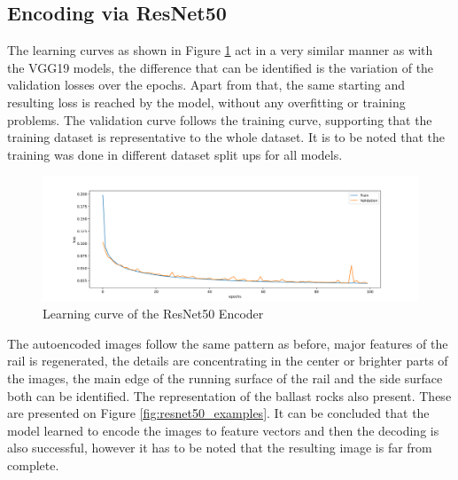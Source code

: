 \subsection{Encoding via ResNet50}
The learning curves as shown in Figure \ref{fig:resnet50_learning_curve} act in a very similar manner
as with the VGG19 models,
the difference that can be identified is the variation of the validation losses over the epochs.
Apart from that, the same starting and resulting loss is reached by the model,
without any overfitting or training problems.
The validation curve follows the training curve, supporting that the training dataset
is representative to the whole dataset.
It is to be noted that the training was done in different dataset split ups for all models.

\begin{figure}[!ht]
    \centering
    \includegraphics[width=\textwidth,trim={0 0 0 1cm},clip]{./results/resnet50_vgg19/20230514_213740_results.png}
    \caption{Learning curve of the ResNet50 Encoder}
    \label{fig:resnet50_learning_curve}
\end{figure}

The autoencoded images follow the same pattern as before, major features of the rail is regenerated,
the details are concentrating in the center or brighter parts of the images,
the main edge of the running surface of the rail and the side surface both can be identified.
The representation of the ballast rocks also present.
These are presented on Figure \ref{fig:resnet50_examples}.
It can be concluded that the model learned to encode the images to feature vectors and then the
decoding is also successful, however it has to be noted that the resulting image is far from complete.

